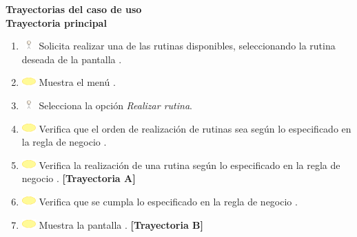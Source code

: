 \textbf{\textcolor[rgb]{0, 0, 0.545098}{Trayectorias del caso de uso}} \\

\textbf{\large{Trayectoria principal}}

\begin{enumerate}
	\item \includegraphics[width=15pt, height=10pt]{./Figuras/iconosCU/usuario.png} Solicita realizar una de las rutinas disponibles, seleccionando la rutina deseada de la pantalla .
	\item \includegraphics[width=15pt]{./Figuras/iconosCU/herramienta.png} Muestra el menú .
	\item \includegraphics[width=15pt, height=10pt]{./Figuras/iconosCU/usuario.png}  Selecciona la opción \textit{Realizar rutina}.
	\item \includegraphics[width=15pt]{./Figuras/iconosCU/herramienta.png} Verifica que el orden de realización de rutinas sea según lo especificado en la regla de negocio .
	\item \includegraphics[width=15pt]{./Figuras/iconosCU/herramienta.png} Verifica la realización de una rutina según lo especificado en la regla de negocio . \textbf{[Trayectoria A]}
	\item \includegraphics[width=15pt]{./Figuras/iconosCU/herramienta.png} Verifica que se cumpla lo especificado en la regla de negocio .
	\item \includegraphics[width=15pt]{./Figuras/iconosCU/herramienta.png} Muestra la pantalla . \textbf{[Trayectoria B]}

\end{enumerate}
